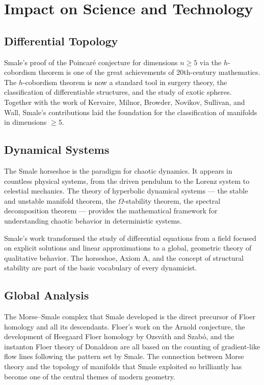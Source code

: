 \section{Impact on Science and Technology}

\subsection{Differential Topology}

Smale's proof of the Poincar\'e conjecture for dimensions \(n \geq 5\) via the \(h\)-cobordism theorem is one of the great achievements of 20th-century mathematics. The \(h\)-cobordism theorem is now a standard tool in surgery theory, the classification of differentiable structures, and the study of exotic spheres. Together with the work of Kervaire, Milnor, Browder, Novikov, Sullivan, and Wall, Smale's contributions laid the foundation for the classification of manifolds in dimensions \(\geq 5\).

\subsection{Dynamical Systems}

The Smale horseshoe is the paradigm for chaotic dynamics. It appears in countless physical systems, from the driven pendulum to the Lorenz system to celestial mechanics. The theory of hyperbolic dynamical systems --- the stable and unstable manifold theorem, the \(\Omega\)-stability theorem, the spectral decomposition theorem --- provides the mathematical framework for understanding chaotic behavior in deterministic systems.

Smale's work transformed the study of differential equations from a field focused on explicit solutions and linear approximations to a global, geometric theory of qualitative behavior. The horseshoe, Axiom A, and the concept of structural stability are part of the basic vocabulary of every dynamicist.

\subsection{Global Analysis}

The Morse--Smale complex that Smale developed is the direct precursor of Floer homology and all its descendants. Floer's work on the Arnold conjecture, the development of Heegaard Floer homology by Ozsv\'ath and Szab\'o, and the instanton Floer theory of Donaldson are all based on the counting of gradient-like flow lines following the pattern set by Smale. The connection between Morse theory and the topology of manifolds that Smale exploited so brilliantly has become one of the central themes of modern geometry.

